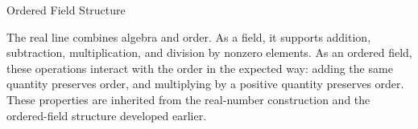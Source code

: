 \label{sec:real-line-ordered-field-structure}

\begin{topicbox}{Ordered Field Structure}
\begin{exposition}
The real line combines algebra and order. As a field, it supports addition,
subtraction, multiplication, and division by nonzero elements. As an ordered
field, these operations interact with the order in the expected way: adding
the same quantity preserves order, and multiplying by a positive quantity
preserves order. These properties are inherited from the real-number
construction and the ordered-field structure developed earlier.
\end{exposition}
\end{topicbox}

